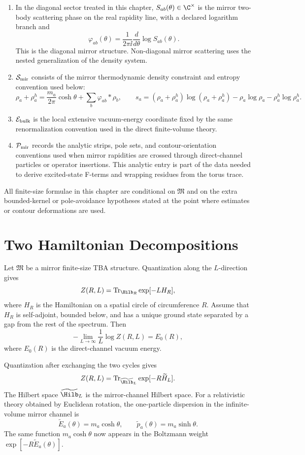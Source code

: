 \begin{hypothesis}
\begin{enumerate}[label=\textnormal{(\roman*)}]
\item In the diagonal sector treated in this chapter,
  \(S_{ab}(\theta)\in\C^\times\) is the mirror two-body scattering phase on
  the real rapidity line, with a declared logarithm branch and
  \[
    \varphi_{ab}(\theta)
    =
    \frac{1}{2\pi\ii}\frac{d}{d\theta}\log S_{ab}(\theta).
  \]
  This is the diagonal mirror structure.  Non-diagonal mirror scattering uses the
  nested generalization of the density system.
\item \(\mathcal S_{\rm mir}\) consists of the mirror thermodynamic
  density constraint and entropy convention used below:
  \[
    \rho_a+\rho_a^h
    =
    \frac{m_a}{2\pi}\cosh\theta
    +
    \sum_b\varphi_{ab}*\rho_b,
    \qquad
    s_a=(\rho_a+\rho_a^h)\log(\rho_a+\rho_a^h)
    -\rho_a\log\rho_a-\rho_a^h\log\rho_a^h .
  \]
\item \(\mathcal E_{\rm bulk}\) is the local extensive vacuum-energy
  coordinate fixed by the same renormalization convention used in the direct
  finite-volume theory.
\item \(\mathcal P_{\rm mir}\) records the analytic strips, pole sets, and
  contour-orientation conventions used when mirror rapidities are crossed
  through direct-channel particles or operator insertions.  This analytic
  entry is part of the data needed to derive excited-state F-terms and
  wrapping residues from the torus trace.
\end{enumerate}
All finite-size formulae in this chapter are conditional on
\(\mathfrak M\) and on the extra bounded-kernel or pole-avoidance hypotheses
stated at the point where estimates or contour deformations are used.
\end{hypothesis}

\section{Two Hamiltonian Decompositions}

Let \(\mathfrak M\) be a mirror finite-size TBA structure.  Quantization along the
\(L\)-direction gives
\[
  Z(R,L)=\operatorname{Tr}_{\Hilb_R}\exp[-L H_R],
\]
where \(H_R\) is the Hamiltonian on a spatial circle of circumference \(R\).
Assume that \(H_R\) is self-adjoint, bounded below, and has a unique ground
state separated by a gap from the rest of the spectrum.  Then
\[
  -\lim_{L\to\infty}\frac{1}{L}\log Z(R,L)=E_0(R),
\]
where \(E_0(R)\) is the direct-channel vacuum energy.

Quantization after exchanging the two cycles gives
\[
  Z(R,L)=\operatorname{Tr}_{\widetilde{\Hilb}_L}\exp[-R\widetilde H_L].
\]
The Hilbert space \(\widetilde{\Hilb}_L\) is the mirror-channel Hilbert space.
For a relativistic theory obtained by Euclidean rotation, the one-particle
dispersion in the infinite-volume mirror channel is
\[
  \widetilde E_a(\theta)=m_a\cosh\theta,\qquad
  \widetilde p_a(\theta)=m_a\sinh\theta .
\]
The same function \(m_a\cosh\theta\) now appears in the Boltzmann weight
\(\exp[-R\widetilde E_a(\theta)]\).

